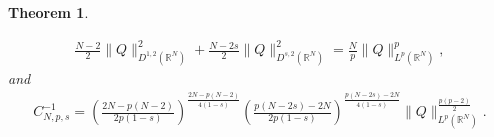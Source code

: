 \documentclass[12pt,a4paper,reqno]{amsart}
\numberwithin{equation}{section}
\newtheorem{theorem}{Theorem}[section]
\newtheorem{remark}{Remark}[section]
\begin{document}
\begin{theorem}
\begin{enumerate}
\begin{equation}\label{1.6}
\begin{aligned}
\frac{N-2}{2}
\|Q\|^{2}_{D^{1,2}(\mathbb{R}^{N})}
+
\frac{N-2s}{2}
\|Q\|^{2}_{D^{s,2}(\mathbb{R}^{N})}
=\frac{N}{p}\|Q\|_{L^{p}(\mathbb{R}^{N})}^{p},
\end{aligned}
\end{equation}
and
\begin{equation}\label{1.7}
\begin{aligned}
C_{N,p,s}^{-1}=
\left(
\frac{2N-p(N-2)}{2p(1-s)}
\right)
^{\frac{2N-p(N-2)}{4(1-s)}}
\left(
\frac{p(N-2s)-2N}{2p(1-s)}
\right)
^{\frac{p(N-2s)-2N}{4(1-s)}}
\|Q\|_{L^{p}(\mathbb{R}^{N})}^{\frac{p(p-2)}{2}}.
\end{aligned}
\end{equation}
\end{enumerate}
\end{theorem}



\end{document}
